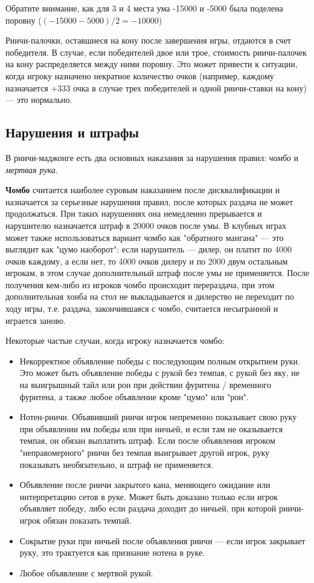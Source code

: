 Обратите внимание, как для 3 и 4 места ума -15000 и -5000 была поделена поровну (\begin{math}(-15000-5000)/2 = -10000\end{math})

Риичи-палочки, оставшиеся на кону после завершения игры, отдаются в счет победителя. В случае, если победителей двое или трое, стоимость риичи-палочек на кону распределяется между ними поровну. Это может привести к ситуации, когда игроку назначено некратное количество очков (например, каждому назначается +333 очка в случае трех победителей и одной риичи-ставки на кону) --- это нормально.

\subsection{Нарушения и штрафы}

В риичи-маджонге есть два основных наказания за нарушения правил: \textit{чомбо} и \textit{мертвая рука}.

\textbf{Чомбо} считается наиболее суровым наказанием после дисквалификации и назначается за серьезные нарушения правил, после которых раздача не может продолжаться. При таких нарушениях она немедленно прерывается и нарушителю назначается штраф в 20000 очков после умы. В клубных играх может также использоваться вариант чомбо как "обратного мангана" --- это выглядит как "цумо наоборот": если нарушитель --- дилер, он платит по 4000 очков каждому, а если нет, то 4000 очков дилеру и по 2000 двум остальным игрокам, в этом случае дополнительный штраф после умы не применяется. После получения кем-либо из игроков чомбо происходит перераздача, при этом дополнительная хонба на стол не выкладывается и дилерство не переходит по ходу игры, т.е. раздача, закончившаяся с чомбо, считается несыгранной и играется заново.

Некоторые частые случаи, когда игроку назначается чомбо:
\begin{itemize}
	\item Некорректное объявление победы с последующим полным открытием руки. Это может быть объявление победы с рукой без темпая, с рукой без яку, не на выигрышный тайл или рон при действии фуритена / временного фуритена, а также любое объявление кроме "цумо" или "рон".
	\item Нотен-риичи. Объявивший риичи игрок непременно показывает свою руку при объявлении им победы или при ничьей, и если там не оказывается темпая, он обязан выплатить штраф. Если после объявления игроком "неправомерного" риичи без темпая выигрывает другой игрок, руку показывать необязательно, и штраф не применяется.
	\item Объявление после риичи закрытого кана, меняющего ожидание или интерпретацию сетов в руке. Может быть доказано только если игрок объявляет победу, либо если раздача доходит до ничьей, при которой риичи-игрок обязан показать темпай.
	\item Сокрытие руки при ничьей после объявления риичи --- если игрок закрывает руку, это трактуется как признание нотена в руке.
	\item Любое объявление с мертвой рукой.
\end{itemize}

